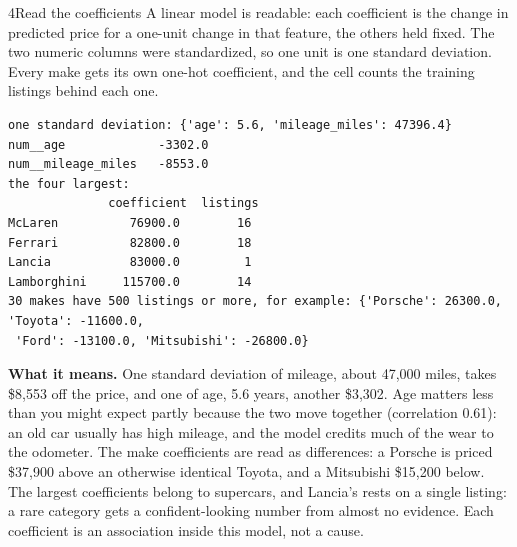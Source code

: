 \begin{labquestion}{4}{Read the coefficients}
A linear model is readable: each coefficient is the change in predicted price for a one-unit change in that feature, the others held fixed. The two numeric columns were standardized, so one unit is one standard deviation. Every make gets its own one-hot coefficient, and the cell counts the training listings behind each one.
\end{labquestion}
\begin{labanswer}

\begin{refoutput}
\begin{lstlisting}[style=utpterminal]
one standard deviation: {'age': 5.6, 'mileage_miles': 47396.4}
num__age             -3302.0
num__mileage_miles   -8553.0
the four largest:
              coefficient  listings
McLaren          76900.0        16
Ferrari          82800.0        18
Lancia           83000.0         1
Lamborghini     115700.0        14
30 makes have 500 listings or more, for example: {'Porsche': 26300.0, 'Toyota': -11600.0,
 'Ford': -13100.0, 'Mitsubishi': -26800.0}
\end{lstlisting}
\end{refoutput}

\textbf{What it means.} One standard deviation of mileage, about 47,000 miles, takes \$8,553 off the price, and one of age, 5.6 years, another \$3,302. Age matters less than you might expect partly because the two move together (correlation 0.61): an old car usually has high mileage, and the model credits much of the wear to the odometer. The make coefficients are read as differences: a Porsche is priced \$37,900 above an otherwise identical Toyota, and a Mitsubishi \$15,200 below. The largest coefficients belong to supercars, and Lancia's rests on a single listing: a rare category gets a confident-looking number from almost no evidence. Each coefficient is an association inside this model, not a cause.
\end{labanswer}

